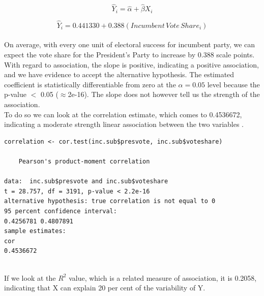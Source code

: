 \documentclass[12pt,letterpaper]{article}
\begin{document}
{\large 			$$\hat{Y}_i = \hat{\alpha} +  \hat{\beta}X_i $$}


{ 			$$\hat{Y}_i =  0.441330 +  0.388(Incumbent \, Vote \, Share_i) $$} \\


\noindent On average, with every one unit of electoral success for incumbent party, we can expect the vote share for the President's Party to increase by 0.388 scale points.\\

\noindent With regard to association, the slope is positive, indicating a positive association, and we have evidence to accept the alternative hypothesis. The estimated coefficient is statistically differentiable from zero at the $\alpha=0.05$ level because the p-value $<$ 0.05 ($\approx $2e-16). The slope does not however tell us the strength of the association. \\

\noindent To do so we can look at the correlation estimate, which comes to 0.4536672, indicating a moderate strength linear association between the two variables .

	\begin{verbatim}
correlation <- cor.test(inc.sub$presvote, inc.sub$voteshare)

	Pearson's product-moment correlation

data:  inc.sub$presvote and inc.sub$voteshare
t = 28.757, df = 3191, p-value < 2.2e-16
alternative hypothesis: true correlation is not equal to 0
95 percent confidence interval:
0.4256781 0.4807891
sample estimates:
cor 
0.4536672 
	
\end{verbatim}

If we look at the $R^2$ value, which is a related measure of association, it is 0.2058, indicating that X can explain 20 per cent of the variability of Y. 




\newpage	
\end{document}
